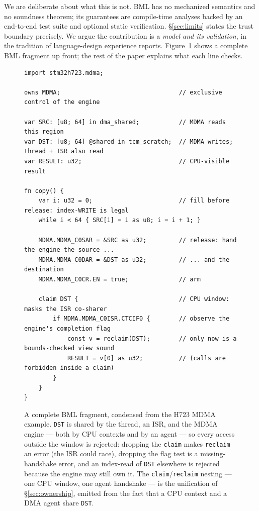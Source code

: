 \documentclass[10pt,twocolumn]{article}
\begin{document}
We are deliberate about what this is not. BML has no mechanized semantics and no
soundness theorem; its guarantees are compile-time analyses backed by an
end-to-end test suite and optional static verification. \S\ref{sec:limits}
states the trust boundary precisely. We argue the contribution is a \emph{model
and its validation}, in the tradition of language-design experience reports.
Figure~\ref{fig:example} shows a complete BML fragment up front; the rest of the
paper explains what each line checks.

\begin{figure}[t]
\begin{lstlisting}
import stm32h723.mdma;

owns MDMA;                                 // exclusive control of the engine

var SRC: [u8; 64] in dma_shared;           // MDMA reads this region
var DST: [u8; 64] @shared in tcm_scratch;  // MDMA writes; thread + ISR also read
var RESULT: u32;                           // CPU-visible result

fn copy() {
    var i: u32 = 0;                        // fill before release: index-WRITE is legal
    while i < 64 { SRC[i] = i as u8; i = i + 1; }

    MDMA.MDMA_C0SAR = &SRC as u32;         // release: hand the engine the source ...
    MDMA.MDMA_C0DAR = &DST as u32;         // ... and the destination
    MDMA.MDMA_C0CR.EN = true;              // arm

    claim DST {                            // CPU window: masks the ISR co-sharer
        if MDMA.MDMA_C0ISR.CTCIF0 {        // observe the engine's completion flag
            const v = reclaim(DST);        // only now is a bounds-checked view sound
            RESULT = v[0] as u32;          // (calls are forbidden inside a claim)
        }
    }
}
\end{lstlisting}
\caption{A complete BML fragment, condensed from the H723 MDMA example.
\texttt{DST} is shared by the thread, an ISR, and the MDMA engine --- both by CPU
contexts and by an agent --- so every access outside the window is
rejected: dropping the \lstinline!claim! makes \lstinline!reclaim! an error (the
ISR could race), dropping the flag test is a missing-handshake error, and an
index-read of \texttt{DST} elsewhere is rejected because the engine may still own
it. The \lstinline!claim!/\lstinline!reclaim! nesting --- one CPU window, one
agent handshake --- is the unification of \S\ref{sec:ownership}, emitted from the
fact that a CPU context and a DMA agent share \texttt{DST}.}
\label{fig:example}
\end{figure}
\end{document}
